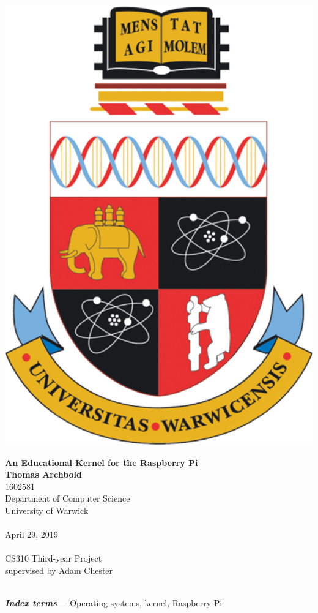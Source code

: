 \documentclass[10pt,a4paper]{article}
\providecommand{\keywords}[1]{\textbf{\textit{Index terms---}} #1}
\begin{document}
\begin{titlepage}
    \begin{center}

        \vspace*{2cm}
        \includegraphics[width=.25\textwidth]{crest.png}

        \vspace*{1cm}
        {\Large \textbf{An Educational Kernel for the Raspberry Pi}} \\

        \vspace*{1cm}
        \textbf{Thomas Archbold} \\
        1602581 \\
        Department of Computer Science \\
        University of Warwick \\~\\

        April 29, 2019 \\~\\

        CS310 Third-year Project \\
        supervised by Adam Chester \\~\\

        \vfill

    \end{center}
\end{titlepage}



\keywords{Operating systems, kernel, Raspberry Pi}

\tableofcontents



\end{document}
